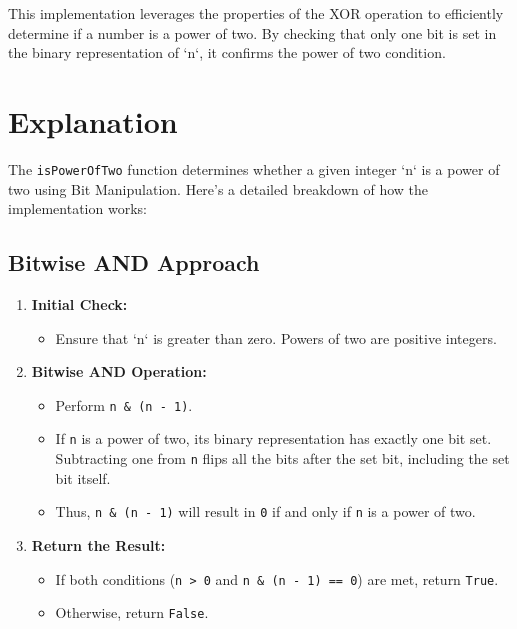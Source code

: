 This implementation leverages the properties of the XOR operation to efficiently determine if a number is a power of two. By checking that only one bit is set in the binary representation of `n`, it confirms the power of two condition.

\section*{Explanation}

The \texttt{isPowerOfTwo} function determines whether a given integer `n` is a power of two using Bit Manipulation. Here's a detailed breakdown of how the implementation works:

\subsection*{Bitwise AND Approach}

\begin{enumerate}
    \item \textbf{Initial Check:} 
    \begin{itemize}
        \item Ensure that `n` is greater than zero. Powers of two are positive integers.
    \end{itemize}
    
    \item \textbf{Bitwise AND Operation:}
    \begin{itemize}
        \item Perform \texttt{n \& (n - 1)}.
        \item If \texttt{n} is a power of two, its binary representation has exactly one bit set. Subtracting one from \texttt{n} flips all the bits after the set bit, including the set bit itself.
        \item Thus, \texttt{n \& (n - 1)} will result in \texttt{0} if and only if \texttt{n} is a power of two.
    \end{itemize}
    
    \item \textbf{Return the Result:}
    \begin{itemize}
        \item If both conditions (\texttt{n > 0} and \texttt{n \& (n - 1) == 0}) are met, return \texttt{True}.
        \item Otherwise, return \texttt{False}.
    \end{itemize}
\end{enumerate}

